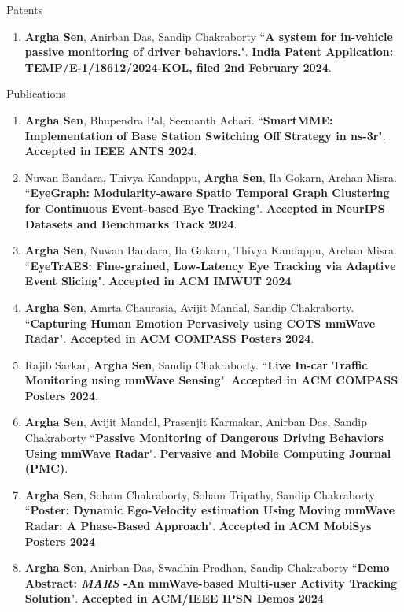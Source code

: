 \documentclass{resume} %
\begin{document}
	\begin{rSection}{Patents}
		\begin{enumerate}
			\item \textbf{Argha Sen}, Anirban Das, Sandip Chakraborty ``\textbf{A system for in-vehicle passive monitoring of driver behaviors.}". \textbf{India Patent Application: TEMP/E-1/18612/2024-KOL, filed 2nd February 2024}.
		\end{enumerate} 
	\end{rSection}
	\newpage
	\begin{rSection}{Publications} 
		\begin{enumerate}
			\small
			\item \textbf{Argha Sen}, Bhupendra Pal, Seemanth Achari. 
			``\textbf{SmartMME: Implementation of Base Station Switching Off Strategy in ns-3r}". \textbf{Accepted in IEEE ANTS 2024}.
			
			\item Nuwan Bandara, Thivya Kandappu, \textbf{Argha Sen}, Ila Gokarn, Archan Misra.
			``\textbf{EyeGraph: Modularity-aware Spatio Temporal Graph Clustering for Continuous Event-based Eye Tracking}".
			\textbf{Accepted in NeurIPS Datasets and Benchmarks Track 2024}.
			
			\item \textbf{Argha Sen}, Nuwan Bandara, Ila Gokarn, Thivya Kandappu, Archan Misra.
			``\textbf{EyeTrAES: Fine-grained, Low-Latency Eye Tracking via Adaptive Event Slicing}".
			\textbf{Accepted in ACM IMWUT 2024}

			\item \textbf{Argha Sen}, Amrta Chaurasia, Avijit Mandal, Sandip Chakraborty. ``\textbf{Capturing Human Emotion Pervasively using COTS mmWave Radar}". \textbf{Accepted in ACM COMPASS Posters 2024}.
			
			\item Rajib Sarkar, \textbf{Argha Sen}, Sandip Chakraborty. ``\textbf{Live In-car Traffic Monitoring using mmWave Sensing}". \textbf{Accepted in ACM COMPASS Posters 2024}.
			
			\item \textbf{Argha Sen}, Avijit Mandal, Prasenjit Karmakar, Anirban Das, Sandip Chakraborty ``\textbf{Passive Monitoring of Dangerous Driving Behaviors Using mmWave Radar}". \textbf{Pervasive and Mobile Computing Journal (PMC)}.
			
			\item \textbf{Argha Sen}, Soham Chakraborty, Soham Tripathy, Sandip Chakraborty ``\textbf{Poster: Dynamic Ego-Velocity estimation Using Moving mmWave Radar: A Phase-Based Approach}". \textbf{Accepted in ACM MobiSys Posters 2024}
			\item \textbf{Argha Sen}, Anirban Das, Swadhin Pradhan, Sandip Chakraborty ``\textbf{Demo Abstract: \textit{MARS} -An mmWave-based Multi-user Activity Tracking Solution}". \textbf{Accepted in ACM/IEEE IPSN Demos 2024}
			

\end{enumerate}
\end{rSection}
\end{document}
